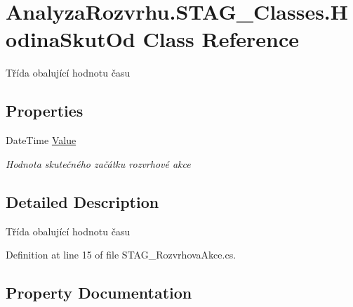 \hypertarget{class_analyza_rozvrhu_1_1_s_t_a_g___classes_1_1_hodina_skut_od}{}\section{Analyza\+Rozvrhu.\+S\+T\+A\+G\+\_\+\+Classes.\+Hodina\+Skut\+Od Class Reference}
\label{class_analyza_rozvrhu_1_1_s_t_a_g___classes_1_1_hodina_skut_od}


Třída obalující hodnotu času  


\subsection*{Properties}
\begin{DoxyCompactItemize}
\item 
Date\+Time \hyperlink{class_analyza_rozvrhu_1_1_s_t_a_g___classes_1_1_hodina_skut_od_a78c55f66c0126b6bbd4dfec34cdbc130}{Value}
\begin{DoxyCompactList}\small\item\em Hodnota skutečného začátku rozvrhové akce \end{DoxyCompactList}\end{DoxyCompactItemize}


\subsection{Detailed Description}
Třída obalující hodnotu času 



Definition at line 15 of file S\+T\+A\+G\+\_\+\+Rozvrhova\+Akce.\+cs.



\subsection{Property Documentation}
\mbox{\label{class_analyza_rozvrhu_1_1_s_t_a_g___classes_1_1_hodina_skut_od_a78c55f66c0126b6bbd4dfec34cdbc130}} 
